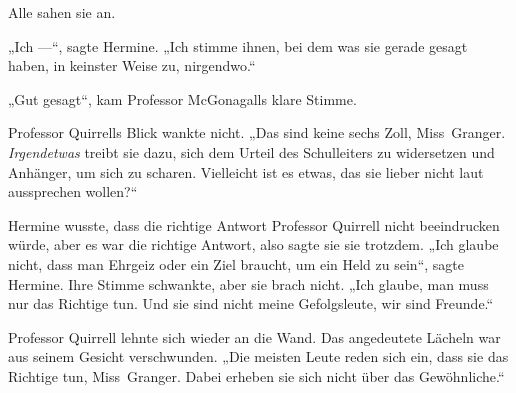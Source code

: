Alle sahen sie an.

„Ich —“, sagte Hermine.
„Ich stimme ihnen, bei dem was sie gerade gesagt haben, in keinster Weise zu, nirgendwo.“

„Gut gesagt“, kam Professor McGonagalls klare Stimme.

Professor Quirrells Blick wankte nicht.
„Das sind keine sechs Zoll, Miss~Granger. \emph{Irgendetwas} treibt sie dazu, sich dem Urteil des Schulleiters zu widersetzen und Anhänger, um sich zu scharen. Vielleicht ist es etwas, das sie lieber nicht laut aussprechen wollen?“

Hermine wusste, dass die richtige Antwort Professor Quirrell nicht beeindrucken würde, aber es war die richtige Antwort, also sagte sie sie trotzdem.
„Ich glaube nicht, dass man Ehrgeiz oder ein Ziel braucht, um ein Held zu sein“, sagte Hermine. Ihre Stimme schwankte, aber sie brach nicht.
„Ich glaube, man muss nur das Richtige tun. Und sie sind nicht meine Gefolgsleute, wir sind Freunde.“

Professor Quirrell lehnte sich wieder an die Wand. Das angedeutete Lächeln war aus seinem Gesicht verschwunden.
„Die meisten Leute reden sich ein, dass sie das Richtige tun, Miss~Granger. Dabei erheben sie sich nicht über das Gewöhnliche.“

